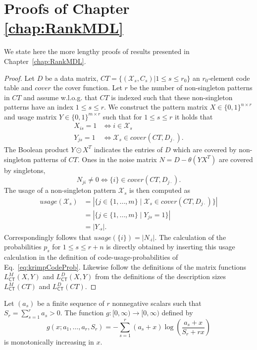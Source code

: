 \chapter{Proofs of Chapter \ref{chap:RankMDL}}\label{chap:AppendixMDL}
We state here the more lengthy proofs of results presented in Chapter~\ref{chap:RankMDL}.
\lctbmf*
\begin{proof}
Let $D$ be a data matrix, $CT=\{(\mathcal{X}_s,C_s)|1\leq  s\leq r_0\}$ an $r_0$-element code table and $cover$ the cover function. Let $r$ be the number of non-singleton patterns in $CT$ and assume w.l.o.g. that $CT$ is indexed such that these non-singleton patterns have an index $1\leq s \leq r$. We construct the pattern matrix $X\in \{0,1\}^{n\times r}$ and usage matrix $Y\in \{0,1\}^{m\times r}$ such that for $1\leq s\leq r$ it holds that
\begin{align*}
X_{is}=1&\Leftrightarrow i\in \mathcal{X}_s\\
Y_{js}=1&\Leftrightarrow \mathcal{X}_s\in cover(CT,D_{j\cdot}).
\end{align*}
The Boolean product $Y\odot X^T$ indicates the entries of $D$ which are covered by non-singleton patterns of $CT$. Ones in the noise matrix $N=D-\theta(YX^T)$ are covered by singletons, 
\[N_{ji}\neq 0\Leftrightarrow \{i\}\in cover(CT,D_{j\cdot}).\]
The usage of a non-singleton pattern $\mathcal{X}_s$ is then computed as
\begin{align*}
usage(\mathcal{X}_s)&=|\{j\in\{1,\ldots,m\}\mid \mathcal{X}_s\in cover(CT,D_{j\cdot})\}|\\
&=|\{j\in\{1,\ldots,m\}\mid Y_{js}=1\}|\\
&=|Y_{\cdot s}|.
\end{align*}
Correspondingly follows that $usage(\{i\})=|N_{\cdot i}|$. The calculation of the probabilities $p_s$ for $1\leq s \leq r+n$ is directly obtained by inserting this usage calculation in the definition of code-usage-probabilities of Eq.~\eqref{eq:krimpCodeProb}. Likewise follow the definitions of the matrix functions $L_{\mathsf{CT}}^M(X,Y)$ and $L_{\mathsf{CT}}^D(X,Y)$ from the definitions of the description sizes $L_{\mathsf{CT}}^M(CT)$ and $L_{\mathsf{CT}}^D(CT)$.
\end{proof}
\begin{lemma}\label{thm:monoticity}
Let $(a_s)$ be a finite sequence of $r$ nonnegative scalars such that $S_r=\sum_{s=1}^ra_s>0$. The function $g:[0,\infty)\rightarrow[0,\infty)$ defined by
\[g(x;a_1,\ldots,a_r,S_r)=-\sum_{s=1}^r(a_s+x)\log\left(\frac{a_s+x}{S_r+rx}\right)\]
is monotonically increasing in $x$.
\end{lemma}
